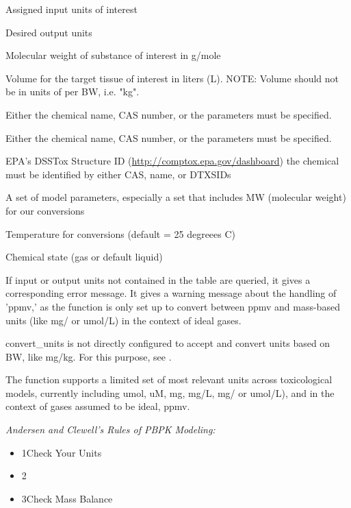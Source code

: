 \documentclass[a4paper]{book}
\begin{document}
\begin{Arguments}
\begin{ldescription}
\item[\code{input.units}] Assigned input units of interest

\item[\code{output.units}] Desired output units

\item[\code{MW}] Molecular weight of substance of interest in g/mole

\item[\code{vol}] Volume for the target tissue of interest in liters (L).
NOTE: Volume should not be in units of per BW, i.e. "kg".

\item[\code{chem.cas}] Either the chemical name, CAS number, or the parameters must
be specified.

\item[\code{chem.name}] Either the chemical name, CAS number, or the parameters
must be specified.

\item[\code{dtxsid}] EPA's DSSTox Structure ID 
(\url{http://comptox.epa.gov/dashboard}) the chemical must be identified by
either CAS, name, or DTXSIDs

\item[\code{parameters}] A set of model parameters, especially a set that
includes MW (molecular weight) for our conversions

\item[\code{temp}] Temperature for conversions (default = 25 degreees C)

\item[\code{state}] Chemical state (gas or default liquid)
\end{ldescription}
\end{Arguments}
%
\begin{Details}\relax
If input or output units not contained in the table are queried,
it gives a corresponding error message. It gives a warning message about the
handling of 'ppmv,' as the function is only set up to convert between ppmv 
and mass-based units (like 
mg/ or umol/L) 
in the context of ideal gases.

convert\_units is not directly configured to accept and convert units based
on BW, like mg/kg. For this purpose, see .

The function supports a limited set of most relevant units across
toxicological models, currently including umol, uM, mg, mg/L, 
mg/ or umol/L), and
in the context of gases assumed to be ideal, ppmv. 

\emph{Andersen and Clewell's Rules of PBPK Modeling:}
\begin{itemize}

\item{} 1Check Your Units
\item{} 2
\item{} 3Check Mass Balance

\end{itemize}

\end{Details}
\end{document}
